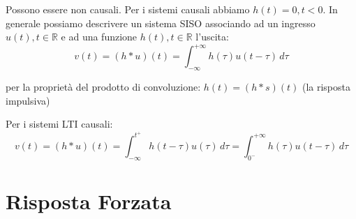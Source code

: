 Possono essere non causali.
Per i sistemi causali abbiamo $h(t) =0, t<0$.
In generale possiamo descrivere un sistema SISO associando ad un ingresso $u(t), t \in \mathbb{R}$ e ad una funzione $h(t), t \in \mathbb{R}$ l'uscita:
\begin{equation}
	v(t)=(h*u)(t) = \int_{-\infty}^{+\infty}h(\tau)u(t-\tau)\,d\tau
	\tag{10}\label{equation 10}
\end{equation}

\begin{oss}
	per la proprietà del prodotto di convoluzione: $h(t)=(h*s)(t)$ (la risposta impulsiva) %
\end{oss}

Per i sistemi LTI causali:
\[
	v(t)=(h*u)(t) = \int_{-\infty}^{t^+}h(t-\tau)u(\tau)\,d\tau = \int_{0^-}^{+\infty}h(\tau)u(t-\tau)\,d\tau
\]



\section{Risposta Forzata}
